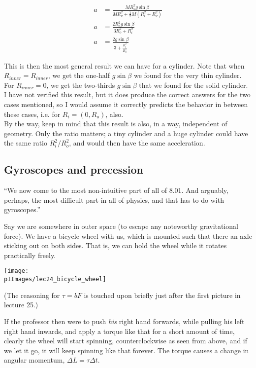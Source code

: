\begin{align}
a &= \frac{M R_o^2 g \sin \beta}{M R_o^2 + \frac{1}{2} M (R_i^2 + R_o^2)}\\
a &= \frac{2 R_o^2 g \sin \beta}{3 R_o^2 + R_i^2}\\
a &= \frac{2 g \sin \beta}{3 + \frac{R_i^2}{R_o^2}}
\end{align}

This is then the most general result we can have for a cylinder. Note that when $R_{inner} = R_{inner}$, we get the one-half $g \sin\beta$ we found for the very thin cylinder. For $R_{inner} = 0$, we get the two-thirds $g \sin \beta$ that we found for the solid cylinder. I have not verified this result, but it does produce the correct answers for the two cases mentioned, so I would assume it correctly predicts the behavior in between these cases, i.e. for $R_i = (0, R_o)$, also.\\
By the way, keep in mind that this result is also, in a way, independent of geometry. Only the ratio matters; a tiny cylinder and a huge cylinder could have the same ratio $R_i^2/R_o^2$, and would then have the same acceleration.

\subsection{Gyroscopes and precession}

``We now come to the most non-intuitive part of all of 8.01. And arguably, perhaps, the most difficult part in all of physics, and that has to do with gyroscopes.''

Say we are somewhere in outer space (to escape any noteworthy gravitational force). We have a bicycle wheel with us, which is mounted such that there an axle sticking out on both sides. That is, we can hold the wheel while it rotates practically freely.

\begin{center}
\texttt{[image: \\pIImages/lec24\_bicycle\_wheel]}
\end{center}

(The reasoning for $\tau = b F$ is touched upon briefly just after the first picture in lecture 25.)

If the professor then were to push \emph{his} right hand forwards, while pulling his left right hand inwards, and apply a torque like that for a short amount of time, clearly the wheel will start spinning, counterclockwise as seen from above, and if we let it go, it will keep spinning like that forever. The torque causes a change in angular momentum, $\Delta L = \tau \Delta t$.

